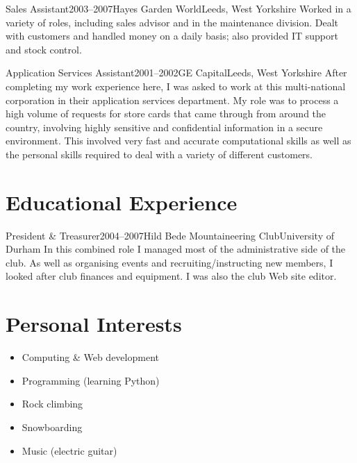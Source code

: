 \documentclass{cv}
\begin{document}
\begin{experience}{Sales Assistant}{2003--2007}{Hayes Garden World}{Leeds, West Yorkshire}
Worked in a variety of roles, including sales advisor and in the maintenance division. Dealt with customers and handled money on a daily basis; also provided IT support and stock control.
\end{experience}

\begin{experience}{Application Services Assistant}{2001--2002}{GE Capital}{Leeds, West Yorkshire}
After completing my work experience here, I was asked to work at this multi-national corporation in their application services department. My role was to process a high volume of requests for store cards that came through from around the country, involving highly sensitive and confidential information in a secure environment. This involved very fast and accurate computational skills as well as the personal skills required to deal with a variety of different customers.
\end{experience}

\section{Educational Experience}

\begin{experience}{President \& Treasurer}{2004--2007}{Hild Bede Mountaineering Club}{University of Durham}
In this combined role I managed most of the administrative side of the club. As well as organising events and recruiting/instructing new members, I looked after club finances and equipment. I was also the club Web site editor.
\end{experience}

\section{Personal Interests}

\begin{itemize}
\item Computing \& Web development
\item Programming (learning Python)
\item Rock climbing
\item Snowboarding
\item Music (electric guitar)
\end{itemize}
\end{document}
